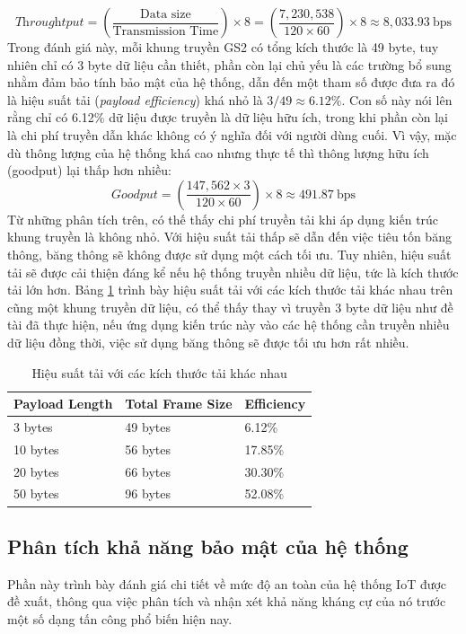 \[
\textit{Throughtput} = \left( \frac{\text{Data size}}{\text{Transmission Time}} \right) \times 8 = \left( \frac{7,230,538}{120 \times 60} \right) \times 8 \approx 8,033.93 \ \text{bps}
\]
Trong đánh giá này, mỗi khung truyền GS2 có tổng kích thước là 49 byte, tuy nhiên chỉ có 3 byte dữ liệu cần thiết, phần còn lại chủ yếu là các trường bổ sung nhằm đảm bảo tính bảo mật của hệ thống, dẫn đến một tham số được đưa ra đó là hiệu suất tải (\textit{payload efficiency}) khá nhỏ là $3/49 \approx 6.12\%$. Con số này nói lên rằng chỉ có 6.12\% dữ liệu được truyền là dữ liệu hữu ích, trong khi phần còn lại là chi phí truyền dẫn khác không có ý nghĩa đối với người dùng cuối. Vì vậy, mặc dù thông lượng của hệ thống khá cao nhưng thực tế thì thông lượng hữu ích (goodput) lại thấp hơn nhiều:
\[
\textit{Goodput} = \left( \frac{147,562 \times 3}{120 \times 60} \right) \times 8 \approx 491.87 \ \text{bps}
\]
Từ những phân tích trên, có thế thấy chi phí truyền tải khi áp dụng kiến trúc khung truyền là không nhỏ. Với hiệu suất tải thấp sẽ dẫn đến việc tiêu tốn băng thông, băng thông sẽ không được sử dụng một cách tối ưu. Tuy nhiên, hiệu suất tải sẽ được cải thiện đáng kể nếu hệ thống truyền nhiều dữ liệu, tức là kích thước tải lớn hơn. Bảng \ref{tab:efficiency} trình bày hiệu suất tải với các kích thước tải khác nhau trên cũng một khung truyền dữ liệu, có thể thấy thay vì truyền 3 byte dữ liệu như đề tài đã thực hiện, nếu ứng dụng kiến trúc này vào các hệ thống cần truyền nhiều dữ liệu đồng thời, việc sử dụng băng thông sẽ được tối ưu hơn rất nhiều.
\begin{table}[h]
\centering
\small
\caption{Hiệu suất tải với các kích thước tải khác nhau}
\label{tab:efficiency}
\begin{tabular}{|p{4cm}|p{5cm}|p{3cm}|}
\hline
Payload Length & Total Frame Size & Efficiency \\
\hline
3 bytes   & 49 bytes  & 6.12\%  \\
10 bytes  & 56 bytes & 17.85\% \\
20 bytes  & 66 bytes & 30.30\% \\
50 bytes  & 96 bytes & 52.08\% \\
\hline
\end{tabular}
\end{table}
\subsection{Phân tích khả năng bảo mật của hệ thống}
Phần này trình bày đánh giá chi tiết về mức độ an toàn của hệ thống IoT được đề xuất, thông qua việc phân tích và nhận xét khả năng kháng cự của nó trước một số dạng tấn công phổ biến hiện nay.

